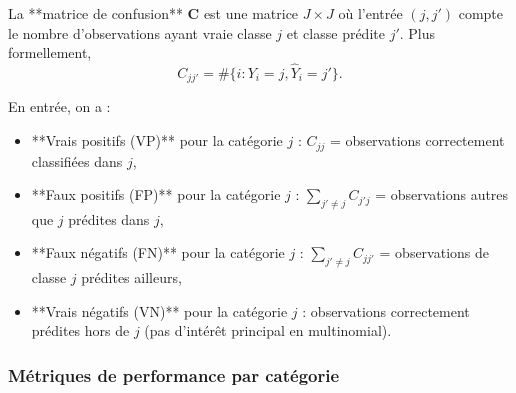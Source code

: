 \documentclass[12pt,a4paper]{article}
\begin{document}
La **matrice de confusion** $\mathbf{C}$ est une matrice $J \times J$ où l'entrée $(j, j')$ compte le nombre d'observations ayant vraie classe $j$ et classe prédite $j'$. Plus formellement,
\begin{equation}
C_{jj'} = \#\{ i : Y_i = j, \widehat{Y}_i = j' \}.
\end{equation}

En entrée, on a :
\begin{itemize}
    \item **Vrais positifs (VP)** pour la catégorie $j$ : $C_{jj}$ = observations correctement classifiées dans $j$,
    \item **Faux positifs (FP)** pour la catégorie $j$ : $\sum_{j' \neq j} C_{j'j}$ = observations autres que $j$ prédites dans $j$,
    \item **Faux négatifs (FN)** pour la catégorie $j$ : $\sum_{j' \neq j} C_{jj'}$ = observations de classe $j$ prédites ailleurs,
    \item **Vrais négatifs (VN)** pour la catégorie $j$ : observations correctement prédites hors de $j$ (pas d'intérêt principal en multinomial).
\end{itemize}

\subsubsection{Métriques de performance par catégorie}
\end{document}
